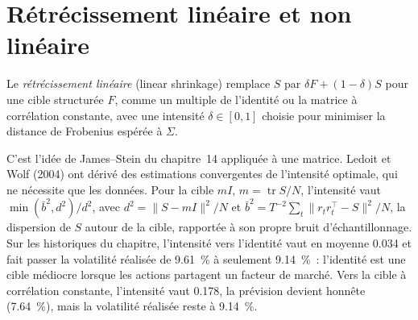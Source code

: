 \begin{omfigure}

\label{fig:qm:covariance-estimation-and-random-matrices:spike}
\end{omfigure}

\section{Rétrécissement linéaire et non linéaire}

\begin{definition}\label{def:qm:covariance-estimation-and-random-matrices:linear}
Le \emph{rétrécissement linéaire} (linear shrinkage) remplace $S$ par $\delta F + (1 - \delta)S$ pour une cible structurée $F$, comme un multiple de l'identité ou la matrice à corrélation
constante, avec une intensité $\delta \in [0, 1]$ choisie pour minimiser la distance de Frobenius espérée à $\Sigma$.
\end{definition}

C'est l'idée de James--Stein du chapitre~14 appliquée à une matrice. Ledoit et Wolf (2004) ont dérivé des estimations convergentes de l'intensité optimale, qui ne nécessite que les données. Pour
la cible $mI$, $m = \operatorname{tr}S/N$, l'intensité vaut $\min(\bar b^2, d^2)/d^2$, avec $d^2 = \lVert S - mI\rVert^2/N$ et $\bar b^2 = T^{-2}\sum_t\lVert r_tr_t^\top - S\rVert^2/N$, la dispersion de $S$ autour de la
cible, rapportée à son propre bruit d'échantillonnage. Sur les historiques du chapitre, l'intensité vers l'identité vaut en moyenne 0.034 et fait passer la volatilité réalisée de 9.61~\% à seulement
9.14~\%~: l'identité est une cible médiocre lorsque les actions partagent un facteur de marché. Vers la cible à corrélation constante, l'intensité vaut 0.178, la prévision devient honnête (7.64~\%), mais la
volatilité réalisée reste à 9.14~\%.

